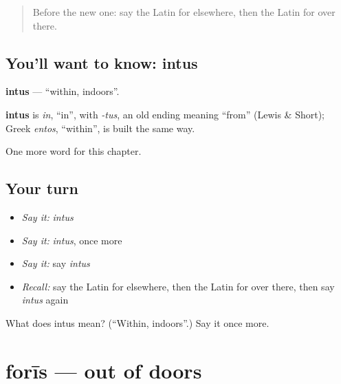 \label{lesson:LA-C177-intus}



\begin{quote}
Before the new one: say the Latin for elsewhere, then the Latin for over there.
\end{quote}

\subsection*{You'll want to know: intus}
\textbf{intus} — \textquotedblleft{}within, indoors\textquotedblright{}.

\begin{cousinweb}
\textbf{intus} is \emph{in}, \textquotedblleft{}in\textquotedblright{}, with \emph{-tus}, an old ending meaning \textquotedblleft{}from\textquotedblright{} (Lewis \& Short); Greek \emph{entos}, \textquotedblleft{}within\textquotedblright{}, is built the same way.
\end{cousinweb}

\begin{grammarlens}[title={What you've built}]
One more word for this chapter.
\end{grammarlens}

\subsection*{Your turn}
\begin{itemize}
\raggedright
  \item \emph{Say it:} \emph{intus}
  \item \emph{Say it:} \emph{intus}, once more
  \item \emph{Say it:} say \emph{intus}
  \item \emph{Recall:} say the Latin for elsewhere, then the Latin for over there, then say \emph{intus} again
\end{itemize}

\begin{tcolorbox}[breakable,colback=teal!4,colframe=teal!35!black,title={Before you move on}]
What does intus mean? (\textquotedblleft{}Within, indoors\textquotedblright{}.) Say it once more.
\end{tcolorbox}
\section[forīs]{forīs — out of doors}

\label{lesson:LA-C177-foris}



